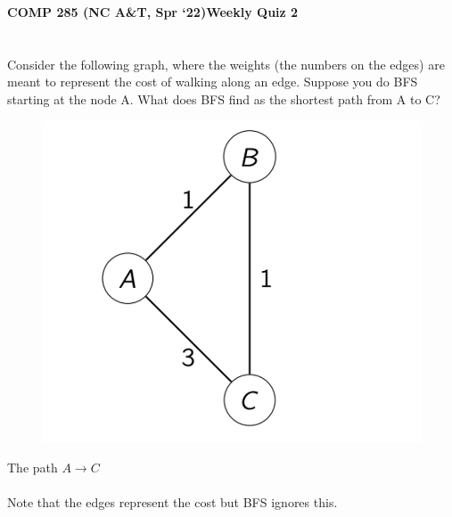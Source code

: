 \documentclass [12pt]{article}
\begin{document}
 

{\LARGE \textbf {COMP 285 (NC A\&T, Spr `22)}\hfill \textbf {Weekly Quiz 2} } 

\section{} Consider the following graph, where the weights (the numbers on the edges) are meant to represent the cost of walking along an edge.
Suppose you do BFS starting at the node A. What does BFS find as the shortest path from A to C?
\begin{figure}[H]
    \centering
    \includegraphics[scale=0.5]{7.png} 
    \label{fig:my_label}
\end{figure}

\begin{Solution}
The path $A \to C$
\paragraph{}
Note that the edges represent the cost but BFS ignores this.
\end{Solution}
\end{document}
